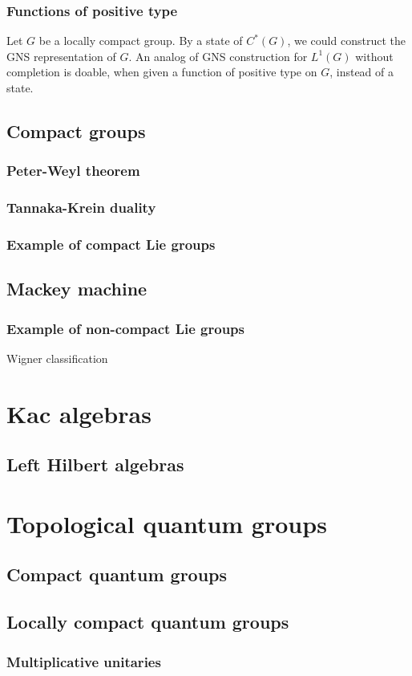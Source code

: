 \documentclass{../../large}
\begin{document}
\section{Functions of positive type}
\begin{prb}
\end{prb}
\begin{prb}
\end{prb}
\begin{prb}
Let $G$ be a locally compact group.
By a state of $C^*(G)$, we could construct the GNS representation of $G$.
An analog of GNS construction for $L^1(G)$ without completion is doable, when given a function of positive type on $G$, instead of a state.
\end{prb}


\chapter{Compact groups}
\section{Peter-Weyl theorem}
\section{Tannaka-Krein duality}
\section{Example of compact Lie groups}

\chapter{Mackey machine}
\section{Example of non-compact Lie groups}
Wigner classification








\part{Kac algebras}
\chapter{Left Hilbert algebras}




\part{Topological quantum groups}
\chapter{Compact quantum groups}
\chapter{Locally compact quantum groups}
\section{Multiplicative unitaries}
\end{document}
